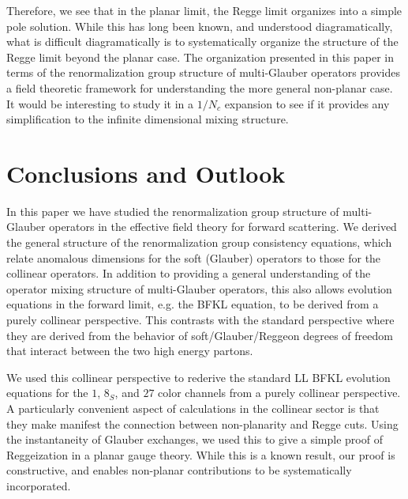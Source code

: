 \documentclass[letterpaper,11pt]{article}
\begin{document}
Therefore, we see that in the planar limit, the Regge limit organizes into a simple pole solution. While this has long been known, and understood diagramatically, what is difficult diagramatically is to systematically organize the structure of the Regge limit beyond the planar case.  The organization presented in this paper in terms of the renormalization group structure of multi-Glauber operators provides a field theoretic framework for understanding the more general non-planar case. It would be interesting to study it in a $1/N_c$ expansion to see if it provides any simplification to the infinite dimensional mixing structure.


\section{Conclusions and Outlook}
\label{sec:conc}

In this paper we have studied the renormalization group structure of multi-Glauber operators in the effective field theory for forward scattering. We derived the general structure of the renormalization group consistency equations, which relate anomalous dimensions for the soft (Glauber) operators to those for the collinear operators. In addition to providing a general understanding of the operator mixing structure of multi-Glauber operators, this also allows evolution equations in the forward limit, e.g. the BFKL equation, to be derived from a purely collinear perspective. This contrasts with the standard perspective where they are derived from the behavior of soft/Glauber/Reggeon degrees of freedom that interact between the two high energy partons.

We used this collinear perspective to rederive the standard LL BFKL evolution equations for the $1$, $8_S$, and $27$ color channels from a purely collinear perspective. A particularly convenient aspect of calculations in the collinear sector is that they make manifest the connection between non-planarity and Regge cuts. Using the instantaneity of Glauber exchanges, we used this to give a simple proof of Reggeization in a planar gauge theory. While this is a known result, our proof is constructive, and enables non-planar contributions to be systematically incorporated.
\end{document}
